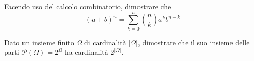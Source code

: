 Facendo uso del calcolo combinatorio, dimostrare che
\begin{equation*}
( a+b)^{n} =\sum\limits _{k=0}^{n}\binom{n}{k} a^{k} b^{n-k}
\end{equation*}
\Esercizio{}

Dato un insieme finito $\Omega $ di cardinalità $| \Omega | $, dimostrare che il suo insieme delle parti $\mathcal{P}( \Omega ) =2^{\Omega }$ ha cardinalità $2^{| \Omega | }$.



\ParteSoluzioni

























